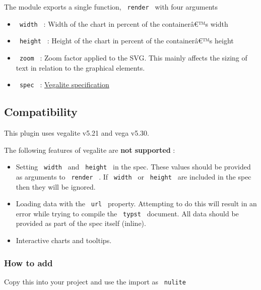 
The module exports a single function, \texttt{\ render\ } with four
arguments

\begin{itemize}
\tightlist
\item
  \texttt{\ width\ } : Width of the chart in percent of the
  containerâ€™s width
\item
  \texttt{\ height\ } : Height of the chart in percent of the
  containerâ€™s height
\item
  \texttt{\ zoom\ } : Zoom factor applied to the SVG. This mainly
  affects the sizing of text in relation to the graphical elements.
\item
  \texttt{\ spec\ } :
  \href{https://vega.github.io/vega-lite/docs/spec.html}{Vegalite
  specification}
\end{itemize}

\subsection{Compatibility}\label{compatibility}

This plugin uses vegalite v5.21 and vega v5.30.

The following features of vegalite are \textbf{not supported} :

\begin{itemize}
\tightlist
\item
  Setting \texttt{\ width\ } and \texttt{\ height\ } in the spec. These
  values should be provided as arguments to \texttt{\ render\ } . If
  \texttt{\ width\ } or \texttt{\ height\ } are included in the spec
  then they will be ignored.
\item
  Loading data with the \texttt{\ url\ } property. Attempting to do this
  will result in an error while trying to compile the \texttt{\ typst\ }
  document. All data should be provided as part of the spec itself
  (inline).
\item
  Interactive charts and tooltips.
\end{itemize}

\subsubsection{How to add}\label{how-to-add}

Copy this into your project and use the import as \texttt{\ nulite\ }


